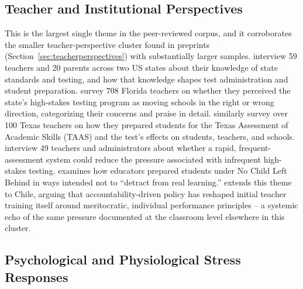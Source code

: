 \documentclass[11pt]{article}
\begin{document}
\subsection{Teacher and Institutional Perspectives}

This is the largest single theme in the peer-reviewed corpus, and it corroborates the smaller teacher-perspective cluster found in preprints (Section~\ref{sec:teacherperspectives}) with substantially larger samples. \citet{barksdale2000stakes} interview 59 teachers and 20 parents across two US states about their knowledge of state standards and testing, and how that knowledge shapes test administration and student preparation. \citet{jones2004voices} survey 708 Florida teachers on whether they perceived the state's high-stakes testing program as moving schools in the right or wrong direction, categorizing their concerns and praise in detail. \citet{gordon1997price} similarly survey over 100 Texas teachers on how they prepared students for the Texas Assessment of Academic Skills (TAAS) and the test's effects on students, teachers, and schools. \citet{yeh2006rapid} interview 49 teachers and administrators about whether a rapid, frequent-assessment system could reduce the pressure associated with infrequent high-stakes testing. \citet{gulek2003preparing} examines how educators prepared students under No Child Left Behind in ways intended not to ``detract from real learning.'' \citet{carrasco2019formacion} extends this theme to Chile, arguing that accountability-driven policy has reshaped initial teacher training itself around meritocratic, individual performance principles -- a systemic echo of the same pressure documented at the classroom level elsewhere in this cluster.

\subsection{Psychological and Physiological Stress Responses}
\end{document}
